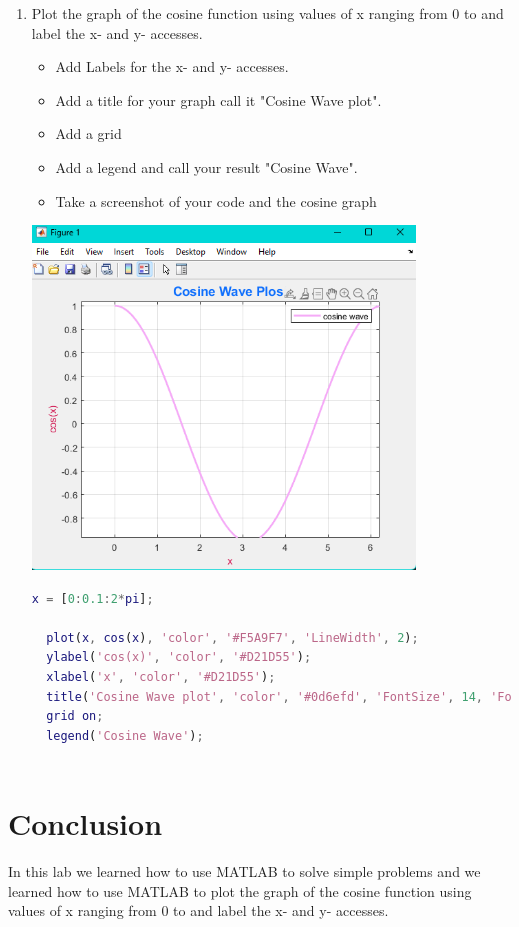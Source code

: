 \documentclass[12pt,a4paper]{article}
\begin{document}
\begin{enumerate}
\begin{lstlisting}[language=Matlab, float=h, frame=tb, label=zebra, caption={output}]
\end{lstlisting}~\\[3cm]
  \item Plot the graph of the cosine function using values of x ranging from 0 to and label the x- and y- accesses.
        \begin{itemize}
          \item Add Labels for the x- and y- accesses.
          \item Add a title for your graph call it "Cosine Wave plot".
          \item Add a grid
          \item Add a legend and call your result "Cosine Wave".
          \item Take a screenshot of your code and the cosine graph
        \end{itemize}
        \includegraphics[width=0.8\textwidth]{images/Picture6.png}~\\[2cm]
        \begin{lstlisting}[language=Matlab,style=mystyle]
  x = [0:0.1:2*pi];

  plot(x, cos(x), 'color', '#F5A9F7', 'LineWidth', 2);
  ylabel('cos(x)', 'color', '#D21D55');
  xlabel('x', 'color', '#D21D55');
  title('Cosine Wave plot', 'color', '#0d6efd', 'FontSize', 14, 'FontName', 'Times New Roman');
  grid on;
  legend('Cosine Wave');
  
\end{lstlisting}
\end{enumerate}

\section{Conclusion}
In this lab we learned how to use MATLAB to solve simple problems and we learned how to use MATLAB to plot the graph of the cosine function using values of x ranging from 0 to and label the x- and y- accesses.

\end{document}
